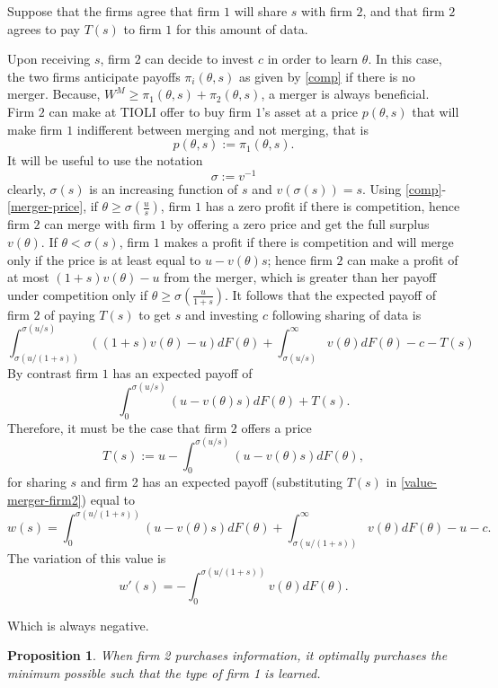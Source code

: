\documentclass[a4paper,leqno]{article}%
\newtheorem{prop}{Proposition}
\renewcommand{\t}{\theta}
\newcommand{\s}{\sigma}
\begin{document}
Suppose that the firms agree that firm $1$ will share $s$ with firm $2$, and that firm $2$ agrees to pay $T(s)$ to firm $1$ for this amount of data. 

Upon receiving $s$, firm $2$ can decide to invest $c$ in order to learn $\t$. In this case, the two firms anticipate payoffs $\pi_i(\t,s)$ as given by \eqref{comp} if there is no merger. Because, $W^M\geq \pi_1(\t,s)+\pi_2(\t,s)$, a merger is always beneficial. Firm $2$ can make at TIOLI offer to buy firm $1$'s asset at a price $p(\t,s)$ that will make firm $1$ indifferent between merging and not merging, that is 
%
\begin{equation}\label{merger-price}
    p(\t,s):=\pi_1(\t,s).  
\end{equation}
%
It will be useful to use the notation
%
\[
\s:=v^{-1}
\]
clearly, $\s(s)$ is an increasing function of $s$ and $v(\s(s))=s$. Using \eqref{comp}-\eqref{merger-price}, if $\t\geq \s(\frac{u}{s})$, firm $1$ has a zero profit if there is competition, hence firm $2$ can merge with firm $1$ by offering a zero price and get the full surplus $v(\t)$. If $\t< \s(s)$, firm $1$ makes a profit if there is competition and will merge only if the price is at least equal to $u-v(\t)s$; hence firm $2$ can make a profit of at most $(1+s)v(\t)-u$ from the merger, which is greater than her payoff under competition only if $\t\geq \s(\frac{u}{1+s})$. It follows that the expected payoff of firm $2$ of paying $T(s)$ to get $s$ and investing $c$ following sharing of data is 
%
\begin{equation}\label{value-merger-firm2}
    \int_{\s(u/(1+s))}^{\s(u/s)} ((1+s)v(\t)-u)dF(\t)+\int_{\s(u/s)}^\infty v(\t)dF(\t)-c-T(s)
\end{equation}
%
By contrast firm $1$ has an expected payoff of 
\begin{equation}\label{value-merger-firm1}
    \int_{0}^{\s(u/s)}(u-v(\t)s)dF(\t)+T(s).
\end{equation}
%
Therefore, it must be the case that firm $2$ offers a price
%
\[
T(s):=u-\int_{0}^{\s(u/s)}(u-v(\t)s)dF(\t),
\]
%
for sharing $s$ and firm 2 has an expected payoff (substituting $T(s)$ in \eqref{value-merger-firm2}) equal to 
%
\[
w(s)=\int_0^{\s(u/(1+s))}(u-v(\t)s)dF(\t)+\int_{\s(u/(1+s))}^\infty v(\t)dF(\t)-u-c.
\]
%
The variation of this value is
%
\[
w'(s)= -\int_0^{\s(u/(1+s))}v(\t)dF(\t).
\]


Which is always negative. 

\begin{prop}

When firm 2 purchases information, it optimally purchases the minimum possible such that the type of firm 1 is learned. 

\end{prop}
\end{document}
